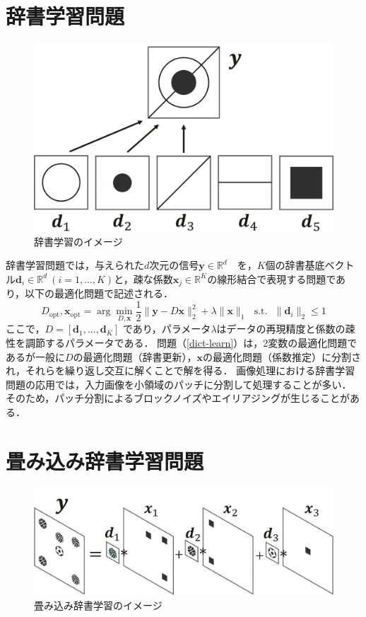\section{辞書学習問題}
\begin{figure}[htb]
	\centering
	\includegraphics[width=0.7\linewidth]{image/dl}
	\caption{辞書学習のイメージ}
	\label{fig:dl}
\end{figure}

辞書学習問題では，与えられた$d$次元の信号$\bm y\in\mathbb{R}^d$　を，$K$個の辞書基底ベクトル$\bm d_i\in\mathbb{R}^d~(i=1,...,K)$と，疎な係数$\bm x_j\in\mathbb{R}^K$の線形結合で表現する問題であり，以下の最適化問題で記述される．
\begin{equation}
	D_{\text{opt}},\bm x_{\text{opt}}=\arg\min_{D, \bm x}\frac{1}{2}\|\bm y-D\bm x\|_2^2+\lambda\|\bm x\|_1~~~\text{s.t.}~~~\|\bm d_i\|_2\leq 1
	\label{dict-learn}
\end{equation}
ここで，$D=[\bm d_1,...,\bm d_K]$ であり，パラメータ$\lambda$はデータの再現精度と係数の疎性を調節するパラメータである．
問題（\ref{dict-learn}）は，2変数の最適化問題であるが一般に$D$の最適化問題（辞書更新），$\bm x$の最適化問題（係数推定）に分割され，それらを繰り返し交互に解くことで解を得る．
画像処理における辞書学習問題の応用では，入力画像を小領域のパッチに分割して処理することが多い．
そのため，パッチ分割によるブロックノイズやエイリアジングが生じることがある．

\section{畳み込み辞書学習問題}
\begin{figure}[htb]
	\centering
	\includegraphics[width=0.7\linewidth]{image/cdl}
	\caption{畳み込み辞書学習のイメージ}
	\label{fig:cdl}
\end{figure}

